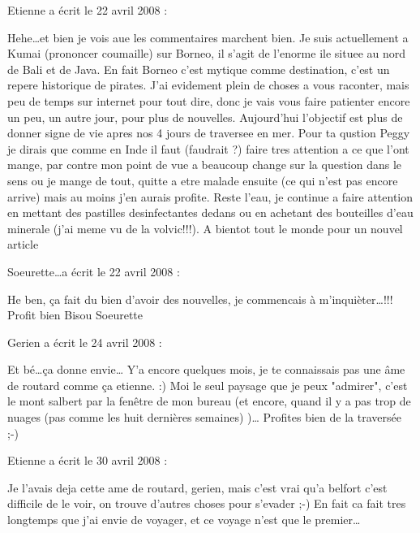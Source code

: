 \medskip
Etienne a écrit le 22 avril 2008 :
\begin{displayquote}
Hehe\dots et bien je vois aue les commentaires marchent bien.
Je suis actuellement a Kumai (prononcer coumaille) sur Borneo, il s'agit de l'enorme ile situee au nord de Bali et de Java.
En fait Borneo c'est mytique comme destination, c'est un repere historique de pirates.
J'ai evidement plein de choses a vous raconter, mais peu de temps sur internet pour tout dire, donc je vais vous faire patienter encore un peu, un autre jour, pour plus de nouvelles. Aujourd'hui l'objectif est plus de donner signe de vie apres nos 4 jours de traversee en mer.
Pour ta qustion Peggy je dirais que comme en Inde il faut (faudrait ?) faire tres attention a ce que l'ont mange, par contre mon point de vue a beaucoup change sur la question dans le sens ou je mange de tout, quitte a etre malade ensuite (ce qui n'est pas encore arrive) mais au moins j'en aurais profite. Reste l'eau, je continue a faire attention en mettant des pastilles desinfectantes dedans ou en achetant des bouteilles d'eau minerale (j'ai meme vu de la volvic!!!).
A bientot tout le monde pour un nouvel article
\end{displayquote}

\medskip
Soeurette\dots a écrit le 22 avril 2008 :
\begin{displayquote}
He ben, ça fait du bien  d'avoir des nouvelles, je commencais à m'inquièter\dots!!!
Profit bien
Bisou
Soeurette
\end{displayquote}

\medskip
Gerien a écrit le 24 avril 2008 :
\begin{displayquote}
Et bé\dots ça donne envie\dots
Y'a encore quelques mois, je te connaissais pas une âme de routard comme ça etienne. :)
Moi le seul paysage que je peux "admirer", c'est le mont salbert par la fenêtre de mon bureau (et encore, quand il y a pas trop de nuages (pas comme les huit dernières semaines) )\dots
Profites bien de la traversée ;-)
\end{displayquote}

\medskip
Etienne a écrit le 30 avril 2008 :
\begin{displayquote}
Je l'avais deja cette ame de routard, gerien, mais c'est vrai qu'a belfort c'est difficile de le voir, on trouve d'autres choses pour s'evader ;-) En fait ca fait tres longtemps que j'ai envie de voyager, et ce voyage n'est que le premier\dots
\end{displayquote}

\vfill
